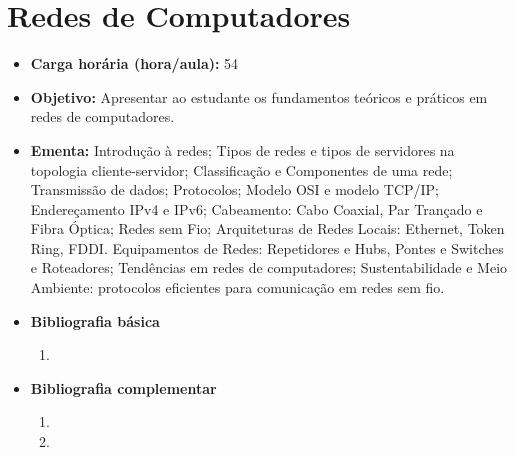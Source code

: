 \documentclass[11pt,fleqn]{book} %
\begin{document}
\section{Redes de Computadores}\label{3_redescomp}
\begin{itemize}
	\item \textbf{Carga horária (hora/aula):} 54
	\item \textbf{Objetivo:} Apresentar ao estudante os fundamentos teóricos e práticos em redes de computadores.
	\item \textbf{Ementa:} 
	Introdução à redes; 
	Tipos de redes e tipos de servidores na topologia cliente-servidor; Classificação e Componentes de uma rede;
	Transmissão de dados;
	Protocolos; 
	Modelo OSI e modelo TCP/IP; 
	Endereçamento IPv4 e IPv6; 
	Cabeamento: Cabo Coaxial, Par Trançado e Fibra Óptica;
	Redes sem Fio;
	Arquiteturas de Redes Locais: Ethernet, Token Ring, FDDI. Equipamentos de Redes: Repetidores e Hubs, Pontes e Switches e Roteadores;
	Tendências em redes de computadores;
	Sustentabilidade e Meio Ambiente: protocolos eficientes para comunicação em redes sem fio.
	\item \textbf{Bibliografia básica}
	\begin{enumerate}
		\item 
	\end{enumerate}
	\item \textbf{Bibliografia complementar}
	\begin{enumerate}
		\item
		\item 
	\end{enumerate}
\end{itemize}

\newpage
\end{document}

